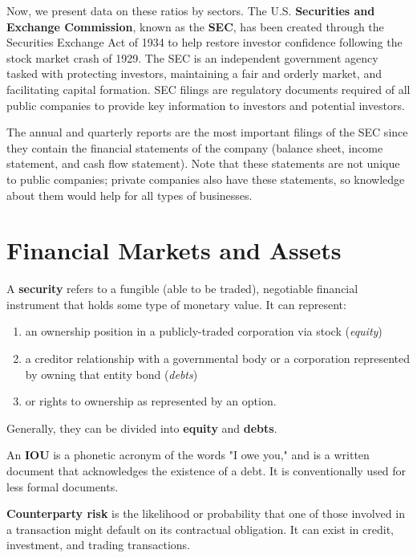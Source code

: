 \documentclass{article}
\begin{document}
Now, we present data on these ratios by sectors.
The U.S. \textbf{Securities and Exchange Commission}, known as the \textbf{SEC}, has been created through the Securities Exchange Act of 1934 to help restore investor confidence following the stock market crash of 1929. The SEC is an independent government agency tasked with protecting investors, maintaining a fair and orderly market, and facilitating capital formation. SEC filings are regulatory documents required of all public companies to provide key information to investors and potential investors.

The annual and quarterly reports are the most important filings of the SEC since they contain the financial statements of the company (balance sheet, income statement, and cash flow statement). Note that these statements are not unique to public companies; private companies also have these statements, so knowledge about them would help for all types of businesses.

\section{Financial Markets and Assets}

  \begin{definition}[Securities]
    A \textbf{security} refers to a fungible (able to be traded), negotiable financial instrument that holds some type of monetary value. It can represent: 
    \begin{enumerate}
        \item an ownership position in a publicly-traded corporation via stock (\textit{equity})
        \item a creditor relationship with a governmental body or a corporation represented by owning that entity bond (\textit{debts})
        \item or rights to ownership as represented by an option. 
    \end{enumerate}
    Generally, they can be divided into \textbf{equity} and \textbf{debts}. 
  \end{definition}

  \begin{definition}[IOU]
    An \textbf{IOU} is a phonetic acronym of the words "I owe you," and is a written document that acknowledges the existence of a debt. It is conventionally used for less formal documents. 
  \end{definition}

  \begin{definition}
    \textbf{Counterparty risk} is the likelihood or probability that one of those involved in a transaction might default on its contractual obligation. It can exist in credit, investment, and trading transactions. 
  \end{definition}
\end{document}
